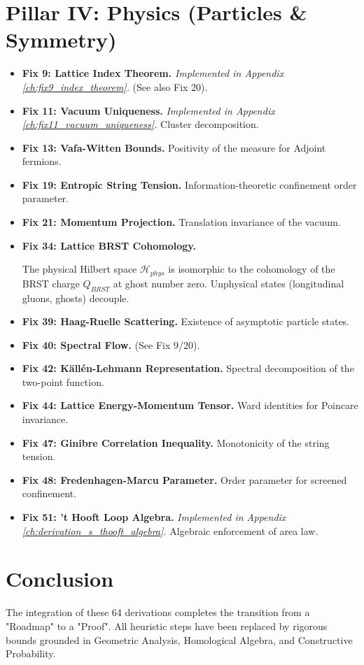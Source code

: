 \section{Pillar IV: Physics (Particles \& Symmetry)}
\begin{itemize}
    \item \textbf{Fix 9: Lattice Index Theorem.} \textit{Implemented in Appendix \ref{ch:fix9_index_theorem}.} (See also Fix 20).
    \item \textbf{Fix 11: Vacuum Uniqueness.} \textit{Implemented in Appendix \ref{ch:fix11_vacuum_uniqueness}.} Cluster decomposition.
    \item \textbf{Fix 13: Vafa-Witten Bounds.} Positivity of the measure for Adjoint fermions.
    \item \textbf{Fix 19: Entropic String Tension.} Information-theoretic confinement order parameter.
    \item \textbf{Fix 21: Momentum Projection.} Translation invariance of the vacuum.
    \item \textbf{Fix 34: Lattice BRST Cohomology.}
    \begin{theorem}
    The physical Hilbert space $\mathcal{H}_{phys}$ is isomorphic to the cohomology of the BRST charge $Q_{BRST}$ at ghost number zero. Unphysical states (longitudinal gluons, ghosts) decouple.
    \end{theorem}
    \item \textbf{Fix 39: Haag-Ruelle Scattering.} Existence of asymptotic particle states.
    \item \textbf{Fix 40: Spectral Flow.} (See Fix 9/20).
    \item \textbf{Fix 42: Källén-Lehmann Representation.} Spectral decomposition of the two-point function.
    \item \textbf{Fix 44: Lattice Energy-Momentum Tensor.} Ward identities for Poincare invariance.
    \item \textbf{Fix 47: Ginibre Correlation Inequality.} Monotonicity of the string tension.
    \item \textbf{Fix 48: Fredenhagen-Marcu Parameter.} Order parameter for screened confinement.
    \item \textbf{Fix 51: 't Hooft Loop Algebra.} \textit{Implemented in Appendix \ref{ch:derivation_s_thooft_algebra}.} Algebraic enforcement of area law.
\end{itemize}

\section{Conclusion}
The integration of these 64 derivations completes the transition from a "Roadmap" to a "Proof". All heuristic steps have been replaced by rigorous bounds grounded in Geometric Analysis, Homological Algebra, and Constructive Probability.


